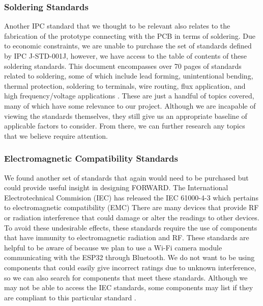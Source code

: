 \subsubsection{Soldering Standards}
\noindent Another IPC standard that we thought to be relevant also relates to the fabrication of the prototype connecting with the PCB in terms of soldering. Due to economic constraints, we are unable to purchase the set of standards defined by IPC J-STD-001J, however, we have access to the table of contents of these soldering standards. This document encompasses over 70 pages of standards related to soldering, some of which include lead forming, unintentional bending, thermal protection, soldering to terminals, wire routing, flux application, and high frequency/voltage applications \cite{ipc_standard}. These are just a handful of topics covered, many of which have some relevance to our project. Although we are incapable of viewing the standards themselves, they still give us an appropriate baseline of applicable factors to consider. From there, we can further research any topics that we believe require attention.\\

\subsubsection{Electromagnetic Compatibility Standards}
\noindent We found another set of standards that again would need to be purchased but could  provide useful insight in designing FORWARD. The International Electrotechnical Commision (IEC) has released the IEC 61000-4-3 which pertains to electromagnetic compatibility (EMC) There are many devices that provide RF or radiation interference that could damage or alter the readings to other devices. To avoid these undesirable effects, these standards require the use of components that have immunity to electromagnetic radiation and RF. These standards are helpful to be aware of because we plan to use a Wi-Fi camera module communicating with the ESP32 through Bluetooth. We do not want to be using components that could easily give incorrect ratings due to unknown interference, so we can also search for components that meet these standards. Although we may not be able to access the IEC standards, some components may list if they are compliant to this particular standard \cite{iec_standard}.\\

